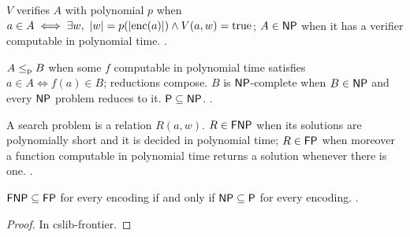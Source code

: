 \begin{definition}
  \label{def:NP}
  \leanok
  $V$ verifies $A$ with polynomial $p$ when
  $a \in A \iff \exists w,\ |w| = p(|\mathrm{enc}(a)|) \wedge V(a, w) = \mathrm{true}$; $A \in \mathsf{NP}$ when it
  has a verifier computable in polynomial time.
  .
\end{definition}

\begin{definition}
  \label{def:reduction}
  \leanok
  $A \le_{\mathrm{p}} B$ when some $f$ computable in polynomial time satisfies $a \in A \iff f(a) \in B$;
  reductions compose. $B$ is $\mathsf{NP}$-complete when $B \in \mathsf{NP}$ and every $\mathsf{NP}$ problem reduces to
  it. $\mathsf{P} \subseteq \mathsf{NP}$.
  .
\end{definition}

\begin{definition}
  \label{def:FNP}
  \leanok
  A search problem is a relation $R(a, w)$. $R \in \mathsf{FNP}$ when its solutions are polynomially short
  and it is decided in polynomial time; $R \in \mathsf{FP}$ when moreover a function computable in
  polynomial time returns a solution whenever there is one.
  .
\end{definition}

\begin{theorem}
  \label{thm:cslib-search-decision}
  \leanok
  $\mathsf{FNP} \subseteq \mathsf{FP}$ for every encoding if and only if $\mathsf{NP} \subseteq \mathsf{P}$ for every encoding.
  .
\end{theorem}

\begin{proof}
  \leanok
  In cslib-frontier.
\end{proof}

